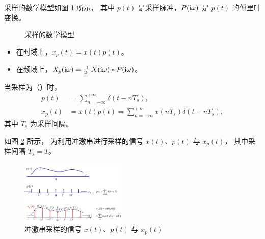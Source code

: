 \begin{definition}
    采样的数学模型如图 \ref{fig:sampling-math-model} 所示，
    其中 $p(t)$ 是采样脉冲，$P(\mathrm{i} \omega)$ 是 $p(t)$ 的傅里叶变换。
    \begin{figure}[H]
        \centering
        \caption{采样的数学模型}
        \label{fig:sampling-math-model}
    \end{figure}

    \begin{itemize}
        \item 在时域上，$x_p(t) = x(t)p(t)$。
        \item 在频域上，$X_p(\mathrm{i} \omega) = \frac{1}{2\pi}X(\mathrm{i} \omega) * P(\mathrm{i} \omega)$。
    \end{itemize}
    当采样为（）时，
    \begin{align*}
        p(t) & = \sum_{n = -\infty}^{+\infty}\delta(t - nT_s), \\
        x_p(t) & = x(t)p(t) = \sum_{n = -\infty}^{+\infty}x(nT_s)\delta(t - nT_s),
    \end{align*}
    其中 $T_s$ 为采样间隔。
\end{definition}

\begin{example}
    如图 \ref{fig:impulse-sampling-time} 所示，
    为利用冲激串进行采样的信号 $x(t)$、$p(t)$ 与 $x_p(t)$，
    其中采样间隔 $T_s = T$。
    \begin{figure}[H]
        \centering
        \includegraphics[width=0.45\textwidth]{chap2/img/impulse-sampling-time.png}
        \caption{冲激串采样的信号 $x(t)$、$p(t)$ 与 $x_p(t)$}
        \label{fig:impulse-sampling-time}
    \end{figure}
\end{example}

